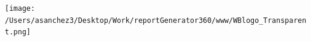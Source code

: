 \documentclass{article}\usepackage[]{graphicx}\usepackage[]{color}
\begin{document}
  \vspace{4ex}
  \begin{minipage}[c]{0.33\textwidth}
    \hspace*{+0.3cm} \texttt{[image: /Users/asanchez3/Desktop/Work/reportGenerator360/www/WBlogo\_Transparent.png]}
  \end{minipage}
  \begin{minipage}[c]{0.60\textwidth}
    \vspace*{-0.1cm}
  \end{minipage}
\end{document}
